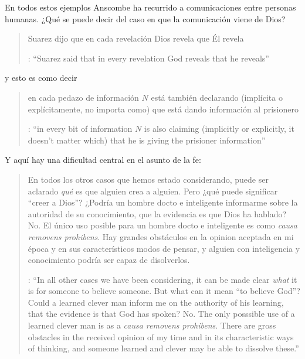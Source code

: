 En todos estos ejemplos Anscombe ha recurrido a comunicaciones entre personas humanas. ¿Qué se puede decir del caso en que la comunicación viene de Dios? \blockquote[{\cite[118]{anscombe1981erp:faith}}: \enquote{Suarez said that in every revelation God reveals that he reveals}]{Suarez dijo que en cada revelación Dios revela que Él revela} y esto es como decir \blockquote[{\cite[118]{anscombe1981erp:faith}}: \enquote{in every bit of information $N$ is also claiming (implicitly or explicitly, it doesn't matter which) that he is giving the prisioner information}]{en cada pedazo de información $N$ está también declarando (implícita o explícitamente, no importa como) que está dando información al prisionero}. Y aquí hay una dificultad central en el asunto de la fe: \blockquote[{\cite[118]{anscombe1981erp:faith}}: \enquote{In all other cases we have been considering, it can be made clear \emph{what} it is for someone to believe someone. But what can it mean ``to believe God''? Could a learned clever man inform me on the authority of his learning, that the evidence is that God has spoken? No. The only posssible use of a learned clever man is as a \emph{causa removens prohibens}. There are gross obstacles in the received opinion of my time and in its characteristic ways of thinking, and someone learned and clever may be able to dissolve these.}]{En todos los otros casos que hemos estado considerando, puede ser aclarado \emph{qué} es que alguien crea a alguien. Pero ¿qué puede significar ``creer a Dios''? ¿Podría un hombre docto e inteligente informarme sobre la autoridad de su conocimiento, que la evidencia es que Dios ha hablado? No. El único uso posible para un hombre docto e inteligente es como \emph{causa removens prohibens}. Hay grandes obstáculos en la opinion aceptada en mi época y en sus característicos modos de pensar, y alguien con inteligencia y conocimiento podría ser capaz de disolverlos.}

